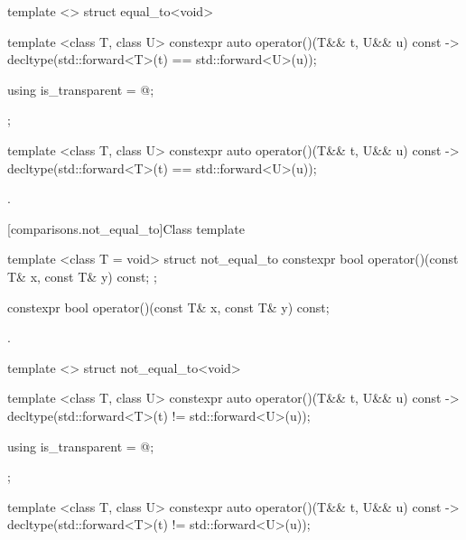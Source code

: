 %
\begin{itemdecl}
template <> struct equal_to<void> {
  template <class T, class U> constexpr auto operator()(T&& t, U&& u) const
    -> decltype(std::forward<T>(t) == std::forward<U>(u));

  using is_transparent = @\unspec@;
};
\end{itemdecl}

%
\begin{itemdecl}
template <class T, class U> constexpr auto operator()(T&& t, U&& u) const
    -> decltype(std::forward<T>(t) == std::forward<U>(u));
\end{itemdecl}

\begin{itemdescr}
\pnum\returns {}.
\end{itemdescr}

[comparisons.not_equal_to]{Class template }

%
\begin{itemdecl}
template <class T = void> struct not_equal_to {
  constexpr bool operator()(const T& x, const T& y) const;
};
\end{itemdecl}

%
\begin{itemdecl}
constexpr bool operator()(const T& x, const T& y) const;
\end{itemdecl}

\begin{itemdescr}
\pnum\returns {}.
\end{itemdescr}

%
\begin{itemdecl}
template <> struct not_equal_to<void> {
  template <class T, class U> constexpr auto operator()(T&& t, U&& u) const
    -> decltype(std::forward<T>(t) != std::forward<U>(u));

  using is_transparent = @\unspec@;
};
\end{itemdecl}

%
\begin{itemdecl}
template <class T, class U> constexpr auto operator()(T&& t, U&& u) const
    -> decltype(std::forward<T>(t) != std::forward<U>(u));
\end{itemdecl}

